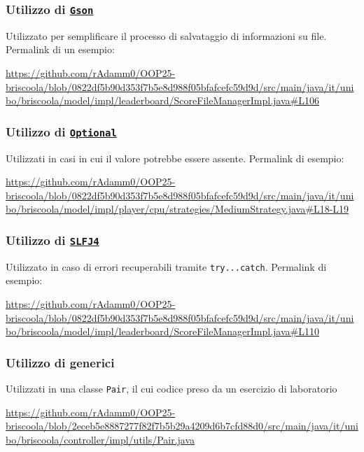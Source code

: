 \documentclass[a4paper,12pt]{report}
\begin{document}
\subsubsection{Utilizzo di \href{https://github.com/google/gson}{\texttt{Gson}}}
 Utilizzato per semplificare il processo di salvataggio di informazioni su file. Permalink di un esempio:
\begin{sloppypar}
    \raggedright
    \url{https://github.com/rAdamm0/OOP25-briscoola/blob/0822df5b90d353f7b5e8d988f05bfafcefc59d9d/src/main/java/it/unibo/briscoola/model/impl/leaderboard/ScoreFileManagerImpl.java#L106}
\end{sloppypar}

\subsubsection{\textbf{Utilizzo di \href{https://docs.oracle.com/javase/8/docs/api/java/util/Optional.html}{\texttt{Optional}}}}
Utilizzati in casi in cui il valore potrebbe essere assente. Permalink di esempio:
\begin{sloppypar}
    \raggedright
    \url{https://github.com/rAdamm0/OOP25-briscoola/blob/0822df5b90d353f7b5e8d988f05bfafcefc59d9d/src/main/java/it/unibo/briscoola/model/impl/player/cpu/strategies/MediumStrategy.java#L18-L19}
\end{sloppypar}

\subsubsection{\textbf{Utilizzo di \href{https://slf4j.org/}{\texttt{SLFJ4}}}}
Utilizzato in caso di errori recuperabili tramite \texttt{try...catch}. Permalink di esempio:
\begin{sloppypar}
    \raggedright
    \url{https://github.com/rAdamm0/OOP25-briscoola/blob/0822df5b90d353f7b5e8d988f05bfafcefc59d9d/src/main/java/it/unibo/briscoola/model/impl/leaderboard/ScoreFileManagerImpl.java#L110}
\end{sloppypar}

\subsubsection{\textbf{Utilizzo di generici}}
Utilizzati in una classe \texttt{Pair}, il cui codice preso da un esercizio di laboratorio
\begin{sloppypar}
    \raggedright
    \url{https://github.com/rAdamm0/OOP25-briscoola/blob/2eceb5e8887277f82f7b5b29a4209d6b7cfd88d0/src/main/java/it/unibo/briscoola/controller/impl/utils/Pair.java}
\end{sloppypar}
\end{document}
